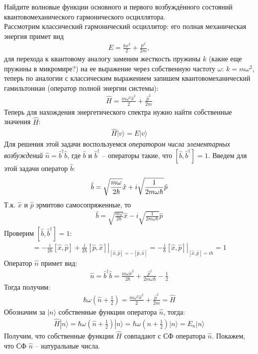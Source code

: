 \documentclass[__main__.tex]{subfiles}
\begin{document}
Найдите волновые функции основного и первого возбуждённого состояний квантовомеханического гармонического осциллятора.\\

Рассмотрим классический гармонический осциллятор: его полная механическая энергия примет вид
\begin{gather*}
E = \frac{kx^2}{2}+\frac{p^2}{2m},
\end{gather*}
для перехода к квантовому аналогу заменим жесткость пружины $k$ (какие еще пружины в микромире?) на ее выражение через собственную частоту $\omega$: $k=m\omega^2$, теперь по аналогии с классическим выражением запишем квантовомеханический гамильтониан (оператор полной энергии системы):
\begin{gather*}
\hat{H} = \frac{m\omega^2\hat{x}^2}{2}+\frac{\hat{p}^2}{2m}
\end{gather*}
Теперь для нахождения энергетического спектра нужно найти собственные значения $\hat{H}$:
\begin{gather*}
\hat{H}|v\rangle = E|v\rangle
\end{gather*}
Для решения этой задачи воспользуемся \textit{оператором числа элементарных возбуждений} $\hat{n}=\hat{b}^\dagger\hat{b}$, где $\hat{b}$ и $\hat{b}^\dagger$ -- операторы такие, что $[\hat{b},\hat{b}^\dagger]=1$. Введем для этой задачи оператор $\hat{b}$: 
\begin{gather}
\hat{b} = \sqrt{\frac{m\omega}{2\hbar}}\hat{x} + i\sqrt{\frac{1}{2m\omega\hbar}}\hat{p}
\llabel{_50:b}
\end{gather}
Т.к. $\hat{x}$ и $\hat{p}$ эрмитово самосопряженные, то
\begin{gather*}
\hat{b} = \sqrt{\frac{m\omega}{2\hbar}}\hat{x} - i\sqrt{\frac{1}{2m\omega\hbar}}\hat{p}
\end{gather*}
Проверим $[\hat{b},\hat{b}^\dagger]=1$:
\begin{gather*}
[\hat{b},\hat{b}^\dagger]
=
\left.
-\frac{i}{2\hbar}[\hat{x},\hat{p}]+\frac{i}{2\hbar}[\hat{p},\hat{x}]
\right|_{[\hat{x},\hat{p}]=-[\hat{p},\hat{x}]}
=
\left.
-\frac{i}{\hbar}[\hat{x},\hat{p}]
\right|_{[\hat{x},\hat{p}]=i\hbar}
=
1
\end{gather*}
Оператор $\hat{n}$ примет вид:
\begin{gather*}
\hat{n}=\hat{b}^\dagger\hat{b}=\frac{m\omega\hat{x}^2}{2\hbar}+\frac{\hat{p}^2}{2m\omega\hbar}-\frac{1}{2}
\end{gather*}
Тогда получим:
\begin{gather*}
\hbar\omega\left(\hat{n}+\frac{1}{2}\right)
=
\frac{m\omega^2\hat{x}^2}{2}+\frac{\hat{p}^2}{2m}
=
\hat{H}
\end{gather*}
Обозначим за $|n\rangle$ собственные функции оператора $\hat{n}$, тогда:
\begin{gather*}
\hat{H}|n\rangle
=
\hbar\omega\left(\hat{n}+\frac{1}{2}\right)|n\rangle
=
\hbar\omega\left(n+\frac{1}{2}\right)|n\rangle
=
E_n|n\rangle
\end{gather*}
Получим, что собственные функции $\hat{H}$ совпадают с СФ оператора $\hat{n}$. Покажем, что СФ $\hat{n}$ -- натуральные числа.
\end{document}
